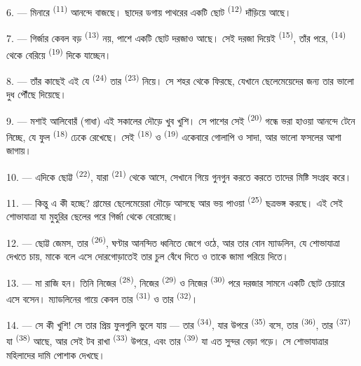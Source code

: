 6. --- মিনারে  \textsuperscript{(11)} আনন্দে বাজছে। ছাদের
ডগায় পাথরের একটি ছোট  \textsuperscript{(12)} দাঁড়িয়ে আছে।

7. --- গির্জার কেবল বড়  \textsuperscript{(13)} নয়, পাশে একটি ছোট
দরজাও আছে। সেই দরজা দিয়েই  \textsuperscript{(15)}, তাঁর
 পরে,  \textsuperscript{(14)} থেকে বেরিয়ে
 \textsuperscript{(19)} দিকে যাচ্ছেন।

8. --- তাঁর কাছেই এই যে  \textsuperscript{(24)} তার
 \textsuperscript{(23)} নিয়ে। সে শহর থেকে ফিরছে, যেখানে
ছেলেমেয়েদের জন্য তার ভালো দুধ পৌঁছে দিয়েছে।

\VUsaut{4.0mm}
\VUsaut{3.4mm}

9. --- মশাই আলিবোরঁ (গাধা) এই সকালের দৌড়ে খুব খুশি। সে পাশের
 সেই  \textsuperscript{(20)} গন্ধে ভরা হাওয়া
আনন্দে টেনে নিচ্ছে, যে ফুল  \textsuperscript{(18)} ঢেকে
রেখেছে। সেই  \textsuperscript{(18)} ও 
\textsuperscript{(19)} একেবারে গোলাপি ও সাদা, আর ভালো ফসলের আশা জাগায়।

10. --- এদিকে ছোট্ট  \textsuperscript{(22)}, যারা
 \textsuperscript{(21)} থেকে আসে, সেখানে গিয়ে গুনগুন করতে করতে
তাদের মিষ্টি  সংগ্রহ করে।

11. --- কিন্তু এ কী হচ্ছে? গ্রামের ছেলেমেয়েরা দৌড়ে আসছে আর ভয় পাওয়া
 \textsuperscript{(25)} ছত্রভঙ্গ করছে। এই সেই শোভাযাত্রা যা
মুহুরির ছেলের  পরে গির্জা থেকে বেরোচ্ছে।

12. --- ছোট্ট জেমস, তার  \textsuperscript{(26)}, ঘণ্টার আনন্দিত
ধ্বনিতে জেগে ওঠে, আর তার বোন ম্যাডলিন, যে শোভাযাত্রা দেখতে চায়, মাকে বলে
এসে দোরগোড়াতেই তার চুল বেঁধে দিতে ও তাকে জামা পরিয়ে দিতে।

13. --- মা রাজি হন। তিনি নিজের  \textsuperscript{(28)},
নিজের  \textsuperscript{(29)} ও নিজের 
\textsuperscript{(30)} পরে দরজার সামনে একটি ছোট চেয়ারে এসে বসেন। ম্যাডলিনের
গায়ে কেবল তার  \textsuperscript{(31)} ও তার 
\textsuperscript{(32)}।

14. --- সে কী খুশি! সে তার প্রিয় ফুলগুলি ভুলে যায় --- তার
 \textsuperscript{(34)}, যার উপরে 
\textsuperscript{(35)} বসে, তার  \textsuperscript{(36)}, তার
 \textsuperscript{(37)} যা 
\textsuperscript{(38)} আছে, আর সেই টব রাখা  \textsuperscript{(33)}
উপরে, এবং তার  \textsuperscript{(39)} যা এত সুন্দর বেড়া গড়ে। সে
শোভাযাত্রার মহিলাদের দামি পোশাক দেখছে।

